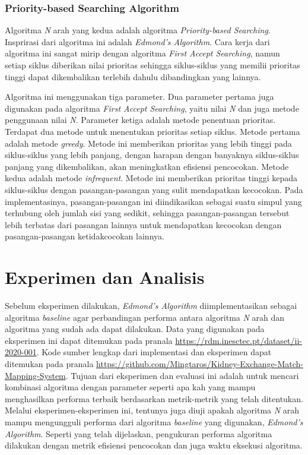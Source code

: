 \documentclass[conference]{IEEEtran}
\begin{document}
\subsubsection{Priority-based Searching Algorithm}
Algoritma \textit{N} arah yang kedua adalah algoritma \textit{Priority-based Searching}. Insprirasi dari algoritma ini adalah
\textit{Edmond's Algorithm}. Cara kerja dari algoritma ini sangat mirip dengan algoritma \textit{First Accept Searching}, namun
setiap siklus diberikan nilai prioritas sehingga siklus-siklus yang memilii prioritas tinggi dapat dikembalikan terlebih
dahulu dibandingkan yang lainnya. 

Algoritma ini menggunakan tiga parameter. Dua parameter pertama juga digunakan pada algoritma \textit{First Accept Searching},
yaitu nilai \textit{N} dan juga metode penggunaan nilai \textit{N}. Parameter ketiga adalah metode penentuan prioritas. Terdapat
dua metode untuk menentukan prioritas setiap siklus. Metode pertama adalah metode \textit{greedy}. Metode ini memberikan prioritas
yang lebih tinggi pada siklus-siklus yang lebih panjang, dengan harapan dengan banyaknya siklus-siklus panjang yang dikembalikan,
akan meningkatkan efisiensi pencocokan. Metode kedua adalah metode \textit{infrequent}. Metode ini memberikan prioritas tinggi
kepada siklus-siklus dengan pasangan-pasangan yang sulit mendapatkan kecocokan. Pada implementasinya, pasangan-pasangan ini diindikasikan
sebagai suatu simpul yang terhubung oleh jumlah sisi yang sedikit, sehingga pasangan-pasangan tersebut lebih terbatas dari pasangan
lainnya untuk mendapatkan kecocokan dengan pasangan-pasangan ketidakcocokan lainnya.

\section{Experimen dan Analisis}
Sebelum eksperimen dilakukan, \textit{Edmond's Algorithm} diimplementasikan sebagai algoritma \textit{baseline} agar perbandingan
performa antara algoritma \textit{N} arah dan algoritma yang sudah ada dapat dilakukan. Data yang digunakan pada eksperimen ini dapat
ditemukan pada pranala \url{https://rdm.inesctec.pt/dataset/ii-2020-001}. Kode sumber lengkap dari implementasi dan eksperimen dapat
ditemukan pada pranala \url{https://github.com/Mingtaros/Kidney-Exchange-Match-Mapping-System}. Tujuan dari eksperimen dan evaluasi
ini adalah untuk mencari kombinasi algoritma dengan parameter seperti apa kah yang mampu menghasilkan performa terbaik berdasarkan
metrik-metrik yang telah ditentukan. Melalui eksperimen-eksperimen ini, tentunya juga diuji apakah algoritma \textit{N} arah mampu
mengungguli performa dari algoritma \textit{baseline} yang digunakan, \textit{Edmond's Algorithm}. Seperti yang telah dijelaskan,
pengukuran performa algoritma dilakukan dengan metrik efisiensi pencocokan dan juga waktu eksekusi algoritma.
\end{document}
